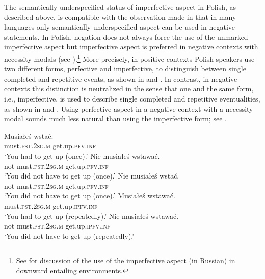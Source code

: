 \documentclass[output=paper]{langscibook}
\begin{document}
The semantically underspecified status of imperfective aspect in Polish, as described above, is compatible with the observation made in \citet{AikhenvaldandDixon1998} that in many languages only semantically underspecified aspect can be used in negative statements. In Polish, negation does not always force the use of the unmarked imperfective aspect but imperfective aspect is preferred in negative contexts with necessity modals (see \citealt{KlimekJankowskaCzypionkaWitkowskiandBlaszczak2018}).\footnote{See \citet{Kagan2008, Kagan2010} for discussion of the use of the imperfective aspect (in Russian) in downward entailing environments.}  More precisely, in positive contexts Polish speakers use two different forms, perfective and imperfective, to distinguish between single completed and repetitive events, as shown in  and . In contrast, in negative contexts this distinction is neutralized in the sense that one and the same form, i.e., imperfective, is used to describe single completed and repetitive eventualities, as shown in  and . Using perfective aspect in a negative context with a necessity modal sounds much less natural than using the imperfective form; see .\largerpage

\ea\label{jan-bla:fansb:kb:ex8}
\ea \gll Musiałeś wstać.\\  
        must.\textsc{pst}.\textsc{2sg}.\textsc{m}  get.up.\textsc{pfv}.\textsc{inf}\\
\glt ‘You had to get up (once).’\label{jan-bla:fansb:kb:ex8a}
\ex \gll Nie musiałeś wstawać.\\  
        not must.\textsc{pst}.\textsc{2sg}.\textsc{m} get.up.\textsc{pfv}.\textsc{inf}\\
\glt ‘You did not have to get up (once).’\label{jan-bla:fansb:kb:ex8b}
\ex \gll Nie musiałeś wstać.\\  
        not must.\textsc{pst}.\textsc{2sg}.\textsc{m}  get.up.\textsc{pfv}.\textsc{inf}\\
\glt ‘You did not have to get up (once).’\label{jan-bla:fansb:kb:ex8c}
\z
\ex\label{jan-bla:fansb:kb:ex9}
\ea \gll Musiałeś wstawać.\\  
        must.\textsc{pst}.\textsc{2sg}.\textsc{m}  get.up.\textsc{ipfv}.\textsc{inf}\\
\glt ‘You had to get up (repeatedly).’\label{jan-bla:fansb:kb:ex9a}
\ex \gll Nie musiałeś wstawać.\\  
        not must.\textsc{pst}.\textsc{2sg}.\textsc{m} get.up.\textsc{ipfv}.\textsc{inf}\\
\glt ‘You did not have to get up (repeatedly).’\label{jan-bla:fansb:kb:ex9b}
\z
\z
\end{document}
